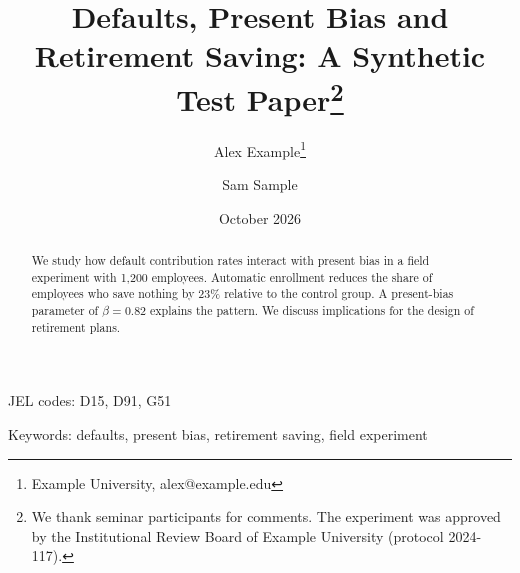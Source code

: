 \documentclass[12pt]{article}
\title{Defaults, Present Bias and Retirement Saving: A Synthetic Test Paper\thanks{We thank seminar participants for comments. The experiment was approved by the Institutional Review Board of Example University (protocol 2024-117).}}
\author{Alex Example\thanks{Example University, alex@example.edu} \and Sam Sample}
\date{October 2026}
\begin{document}
\maketitle
\begin{abstract}
We study how default contribution rates interact with present bias in a field experiment with 1,200 employees. Automatic enrollment reduces the share of employees who save nothing by 23\% relative to the control group. A present-bias parameter of $\beta = 0.82$ explains the pattern. We discuss implications for the design of retirement plans.
\end{abstract}

\noindent JEL codes: D15, D91, G51

\noindent Keywords: defaults, present bias, retirement saving, field experiment




\appendix




\end{document}

